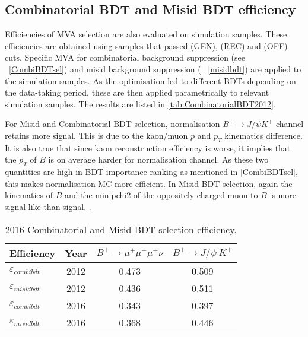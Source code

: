 \subsection{Combinatorial BDT and Misid BDT efficiency}
 Efficiencies of MVA selection are also evaluated on simulation samples. These efficiencies are obtained using samples that passed (GEN), (REC) and (OFF) cuts. Specific MVA for combinatorial background suppression (see ~\autoref{CombiBDTsel}) and misid background suppression ( ~\autoref{misidbdt}) are applied to the simulation samples. As the optimisation led to different BDTs depending on the data-taking period, these are then applied parametrically to relevant simulation samples. The results are listed in \autoref{tab:CombinatorialBDT2012}.

For Misid and Combinatorial BDT selection, normalisation $B^{+} \rightarrow J/\psi K^{+}$ channel retains more signal. This is due to the kaon/muon $p$ and $p_{T}$ kinematics difference. It is also true that since kaon reconstruction efficiency is worse, it implies that the $p_{T}$ of $B$ is on average harder for normalisation channel. As these two quantities are high in BDT importance ranking as mentioned in \autoref{CombiBDTsel}, this makes normalisation MC more efficient. In Misid BDT selection, again the kinematics of $B$ and the \gls{minipchi2} of the oppositely charged muon to $B$ is more signal like than signal. .

\begin{table}[H]
\begin{center}
\begin{tabular}{ l c  c  c }
Efficiency & Year & $B^{+} \rightarrow \mu^{+} \mu^{-} \mu^{+} \nu$  &  $B^{+} \rightarrow J/\psi\ K^{+}$ \\
\hline
$\varepsilon_{combibdt}$& 2012 &0.473 & 0.509 \\
$\varepsilon_{misidbdt}$& 2012 &0.436 & 0.511 \\
\hline
$\varepsilon_{combibdt}$& 2016 &0.343 & 0.397 \\
$\varepsilon_{misidbdt}$& 2016 &0.368 & 0.446 \\	
\hline
\end{tabular}
\end{center}
\caption{2016 Combinatorial and Misid BDT selection efficiency.}
\label{tab:CombinatorialBDT2012}
\end{table}





